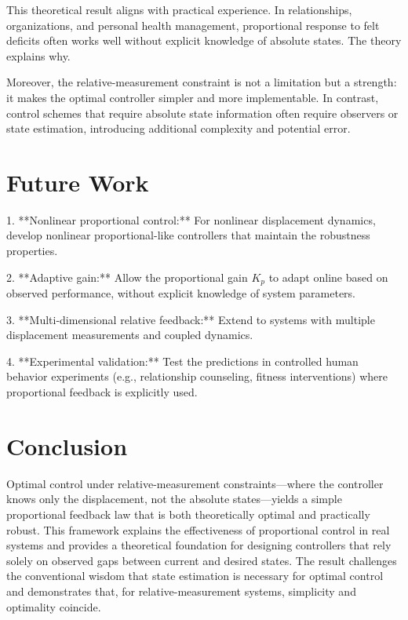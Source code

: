 \documentclass[12pt]{article}
\begin{document}
This theoretical result aligns with practical experience. In relationships, organizations, and personal health management, proportional response to felt deficits often works well without explicit knowledge of absolute states. The theory explains why.

Moreover, the relative-measurement constraint is not a limitation but a strength: it makes the optimal controller simpler and more implementable. In contrast, control schemes that require absolute state information often require observers or state estimation, introducing additional complexity and potential error.

\section{Future Work}

1. **Nonlinear proportional control:** For nonlinear displacement dynamics, develop nonlinear proportional-like controllers that maintain the robustness properties.

2. **Adaptive gain:** Allow the proportional gain $K_p$ to adapt online based on observed performance, without explicit knowledge of system parameters.

3. **Multi-dimensional relative feedback:** Extend to systems with multiple displacement measurements and coupled dynamics.

4. **Experimental validation:** Test the predictions in controlled human behavior experiments (e.g., relationship counseling, fitness interventions) where proportional feedback is explicitly used.

\section{Conclusion}

Optimal control under relative-measurement constraints—where the controller knows only the displacement, not the absolute states—yields a simple proportional feedback law that is both theoretically optimal and practically robust. This framework explains the effectiveness of proportional control in real systems and provides a theoretical foundation for designing controllers that rely solely on observed gaps between current and desired states. The result challenges the conventional wisdom that state estimation is necessary for optimal control and demonstrates that, for relative-measurement systems, simplicity and optimality coincide.
\end{document}
